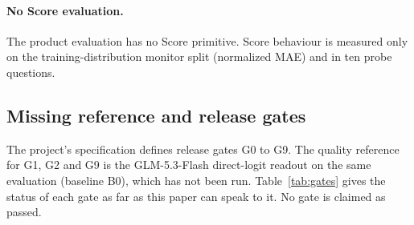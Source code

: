 \paragraph{No Score evaluation.}
The product evaluation has no Score primitive. Score behaviour is measured only on the
training-distribution monitor split (normalized MAE) and in ten probe questions.

\subsection{Missing reference and release gates}
\label{sec:gates}

The project's specification defines release gates G0 to G9. The quality reference for G1,
G2 and G9 is the GLM-5.3-Flash direct-logit readout on the same evaluation (baseline B0),
which has not been run. Table~\ref{tab:gates} gives the status of each gate as far as this
paper can speak to it. No gate is claimed as passed.

